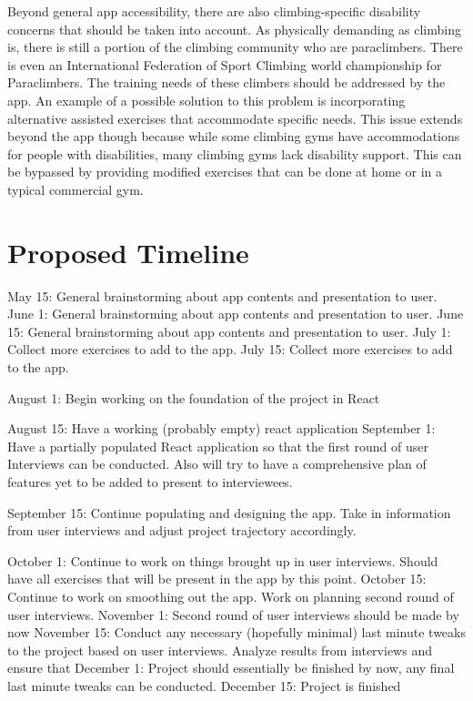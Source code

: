 \documentclass[10pt,twocolumn]{article}
\begin{document}
    Beyond general app accessibility, there are also climbing-specific disability concerns that should be taken into account. As physically demanding as climbing is, there is still a portion of the climbing community who are paraclimbers. There is even an International Federation of Sport Climbing world championship for Paraclimbers. \cite{rcc_climbing_nodate} The training needs of these climbers should be addressed by the app. An example of a possible solution to this problem is incorporating alternative assisted exercises that accommodate specific needs. This issue extends beyond the app though because while some climbing gyms have accommodations for people with disabilities, many climbing gyms lack disability support. This can be bypassed by providing modified exercises that can be done at home or in a typical commercial gym. \cite{rcc_climbing_nodate}



    
\section{Proposed Timeline}

    May 15: General brainstorming about app contents and presentation to user.
    June 1: General brainstorming about app contents and presentation to user.
    June 15: General brainstorming about app contents and presentation to user.
    July 1: Collect more exercises to add to the app.
    July 15: Collect more exercises to add to the app.
    
    August 1: Begin working on the foundation of the project in React
    
    August 15: Have a working (probably empty) react application
    September 1: Have a partially populated React application so that the first round of user Interviews can be conducted. Also will try to have a comprehensive plan of features yet to be added to present to interviewees.
    
    September 15: Continue populating and designing the app. Take in information from user interviews and adjust project trajectory accordingly.
    
    October 1: Continue to work on things brought up in user interviews. Should have all exercises that will be present in the app by this point. 
    October 15: Continue to work on smoothing out the app. Work on planning second round of user interviews. 
    November 1: Second round of user interviews should be made by now
    November 15: Conduct any necessary (hopefully minimal) last minute tweaks to the project based on user interviews. Analyze results from interviews and ensure that 
    December 1: Project should essentially be finished by now, any final last minute tweaks can be conducted. 
    December 15: Project is finished 
    
\end{document}
